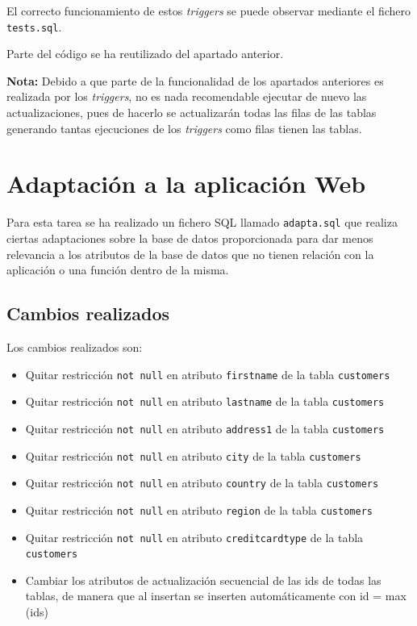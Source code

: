 \documentclass{article}
\begin{document}
El correcto funcionamiento de estos \textit{triggers} se puede observar mediante el fichero \texttt{tests.sql}.

Parte del código se ha reutilizado del apartado anterior.

\textbf{Nota:} Debido a que parte de la funcionalidad de los apartados anteriores es realizada por los \textit{triggers}, no es nada recomendable ejecutar de nuevo las actualizaciones, pues de hacerlo se actualizarán todas las filas de las tablas generando tantas ejecuciones de los \textit{triggers} como filas tienen las tablas.

\section{Adaptación a la aplicación Web}
Para esta tarea se ha realizado un fichero SQL llamado \texttt{adapta.sql} que realiza ciertas adaptaciones sobre la base de datos proporcionada para dar menos relevancia a los atributos de la base de datos que no tienen relación con la aplicación o una función dentro de la misma.

\subsection{Cambios realizados}
Los cambios realizados son:

\begin{itemize}
\item Quitar restricción \texttt{not null} en atributo \texttt{firstname} de la tabla \texttt{customers} 
\item Quitar restricción \texttt{not null} en atributo \texttt{lastname} de la tabla \texttt{customers} 
\item Quitar restricción \texttt{not null} en atributo \texttt{address1} de la tabla \texttt{customers} 
\item Quitar restricción \texttt{not null} en atributo \texttt{city} de la tabla \texttt{customers} 
\item Quitar restricción \texttt{not null} en atributo \texttt{country} de la tabla \texttt{customers} 
\item Quitar restricción \texttt{not null} en atributo \texttt{region} de la tabla \texttt{customers} 
\item Quitar restricción \texttt{not null} en atributo \texttt{creditcardtype} de la tabla \texttt{customers} 
\item Cambiar los atributos de actualización secuencial de las ids de todas las tablas, de manera que al insertan se inserten automáticamente con id = max (ids)
\end{itemize}
\end{document}
